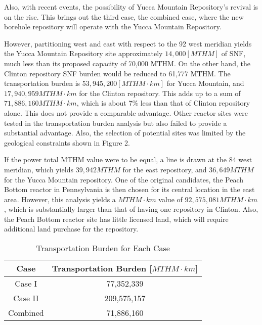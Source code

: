 Also, with recent events, the possibility of Yucca Mountain Repository's revival
is on the rise. This brings out the third case, the combined case, where the new
borehole repository will operate with the Yucca Mountain Repository. 


However, partitioning west and east with respect to the 92 west meridian yields the Yucca
Mountain Repository site approximately 
$14,000 [MTHM]$ of \gls{SNF}, much less than its proposed capacity of 70,000 \gls{MTHM}. On the other hand, 
the Clinton repository \gls{SNF} burden would be reduced to 61,777 \gls{MTHM}. The transportation burden is 
$53,945,200 [MTHM\cdot km]$  
for Yucca Mountain, and $17,940,959 MTHM\cdot km$ for the Clinton repository. This 
adds up to a sum of $71,886,160 MTHM\cdot km$, which is about 7\% less than that
of Clinton repository alone. This does not provide a comparable advantage. Other
reactor sites were tested in the transportation burden analysis but also failed
to provide a substantial advantage. Also, the selection of potential sites
was limited by the geological constraints shown in Figure 2.  

If the power total MTHM value were to be equal, a line is drawn at the 84 west
meridian, which yields $39,942 MTHM$ for the east repository, and $36,649 MTHM$ for
the Yucca Mountain repository. One of the original candidates, the Peach Bottom
reactor in Pennsylvania is then chosen for its central location in the east area.
However, this analysis yields a $MTHM\cdot km$ value of $92,575,081 MTHM\cdot km$,
which is substantially larger than that of having one repository in Clinton. 
Also, the Peach Bottom reactor site has little licensed land, which will require
additional land purchase for the repository. 


\begin{table}[h]
	\centering
        \caption {Transportation Burden for Each Case}
		\begin{tabular}{|c|c|}
			\hline
			Case & Transportation Burden [$MTHM\cdot km$]\\
			\hline
			Case I & 77,352,339 \\
			Case II & 209,575,157 \\
			Combined & 71,886,160\\ 
                        \hline
                \end{tabular}
\end{table}
  


